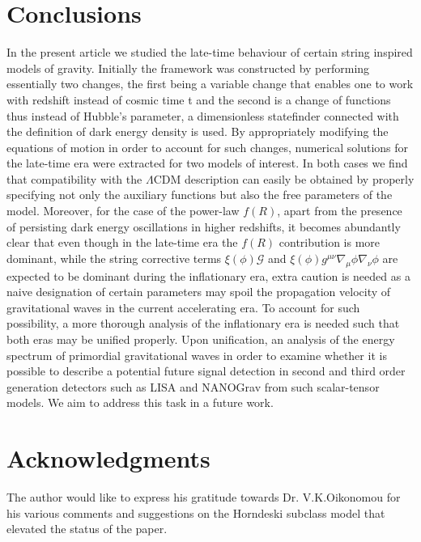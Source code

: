 \documentclass[aps,prd,twocolumn,groupedaddress,showpacs,nofootinbib,amssymb]{revtex4-2}
\begin{document}
\section{Conclusions}
In the present article we studied the late-time behaviour of certain string inspired models of gravity. Initially the framework was constructed by performing essentially two changes, the first being a variable change that enables one to work with redshift instead of cosmic time t and the second is a change of functions thus instead of Hubble's parameter, a dimensionless statefinder connected with the definition of dark energy density is used. By appropriately modifying the equations of motion in order to account for such changes, numerical solutions for the late-time era were extracted for two models of interest. In both cases we find that compatibility with the $\Lambda$CDM description can easily be obtained by properly specifying not only the auxiliary functions but also the free parameters of the model. Moreover, for the case of the power-law $f(R)$, apart from the presence of persisting dark energy oscillations in higher redshifts, it becomes abundantly clear that even though in the late-time era the $f(R)$ contribution is more dominant, while the string corrective terms $\xi(\phi)\mathcal{G}$ and $\xi(\phi)g^{\mu\nu}\nabla_\mu\phi\nabla_\nu\phi$ are expected to be dominant during the inflationary era, extra caution is needed as a naive designation of certain parameters may spoil the propagation velocity of gravitational waves in the current accelerating era. To account for such possibility, a more thorough analysis of the inflationary era is needed such that both eras may be unified properly. Upon unification, an analysis of the energy spectrum of primordial gravitational waves in order to examine whether it is possible to describe a potential future signal detection in second and third order generation detectors such as LISA and NANOGrav from such scalar-tensor models. We aim to address this task in a future work.  










\section*{Acknowledgments}
The author would like to express his gratitude towards Dr. V.K.Oikonomou for his various comments and suggestions on the Horndeski subclass model that elevated the status of the paper. 
\end{document}
